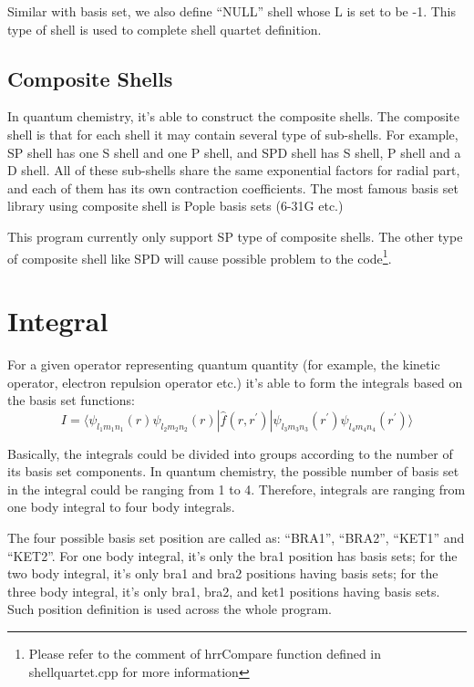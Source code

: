 Similar with basis set, we also define ``NULL'' shell whose 
L is set to be -1. This type of shell is used to complete 
shell quartet definition.

\subsection{Composite Shells}
%
%
\label{composite_shell}
%
%
In quantum chemistry, it's able to construct the composite shells.
The composite shell is that for each shell it may contain several
type of sub-shells. For example, SP shell has one S shell and one 
P shell, and SPD shell has S shell, P shell and a D shell. All of 
these sub-shells share the same exponential factors for radial part,
and each of them has its own contraction coefficients. The most
famous basis set library using composite shell is Pople basis 
sets (6-31G etc.)

This program currently only support SP type of composite shells.
The other type of composite shell like SPD will cause possible
problem to the code\footnote{Please refer to the comment of 
hrrCompare function defined in shellquartet.cpp for more information}.

\section{Integral}
%
%
\label{integral}

For a given operator representing quantum quantity (for example,
the kinetic operator, electron repulsion operator etc.) it's able 
to form the integrals based on the basis set functions:
\begin{equation}
 I = \langle \psi_{l_{1}m_{1}n_{1}}(r)\psi_{l_{2}m_{2}n_{2}}(r)| 
 \hat{f}(r,r^{'})| \psi_{l_{3}m_{3}n_{3}}(r^{'})
 \psi_{l_{4}m_{4}n_{4}}(r^{'})\rangle
\end{equation}

Basically, the integrals could be divided into groups according to the number
of its basis set components. In quantum chemistry, the possible
number of basis set in the integral could be ranging from 1 to 
4. Therefore, integrals are ranging from one body integral to 
four body integrals. 

The four possible basis set position are called as: ``BRA1'', ``BRA2'',
``KET1'' and ``KET2''. For one body integral, it's only the bra1
position has basis sets; for the two body integral, it's only 
bra1 and bra2 positions having basis sets; for the three body integral, 
it's only bra1, bra2, and ket1 positions having basis sets. 
Such position definition is used across the whole program.

